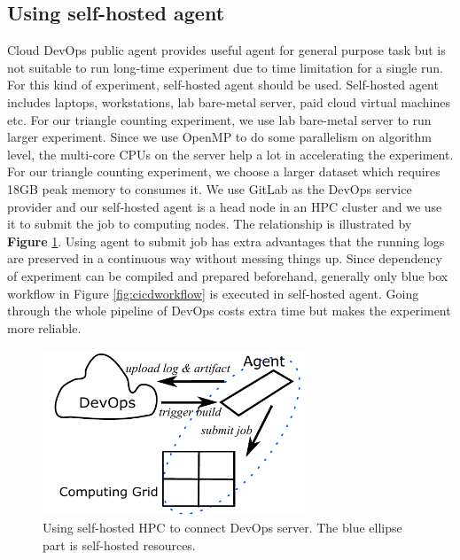 \documentclass[10pt, conference, compsocconf]{IEEEtran}
\begin{document}
\subsection{Using self-hosted agent}
Cloud DevOps public agent provides useful agent for general purpose task but is not suitable to run long-time experiment due to time limitation for a single run. For this kind of experiment, self-hosted agent should be used. Self-hosted agent includes laptops, workstations, lab bare-metal server, paid cloud virtual machines etc.
For our triangle counting experiment, we use lab bare-metal server to run larger experiment. Since we use OpenMP to do some parallelism on algorithm level, the multi-core CPUs on the server help a lot in accelerating the experiment. For our triangle counting experiment, we choose a larger dataset which requires 18GB peak memory to consumes it. We use GitLab as the DevOps service provider and our self-hosted agent is a head node in an HPC cluster and we use it to submit the job to computing nodes.
The relationship is illustrated by {\bf Figure} \ref{fig:selfhosted}. Using agent to submit job has extra advantages that the running logs are preserved in a continuous way without messing things up. Since dependency of experiment can be compiled and prepared beforehand, generally only blue box workflow in Figure \ref{fig:cicdworkflow}
is executed in self-hosted agent. Going through the whole pipeline of DevOps costs extra time but makes the experiment more reliable.

\begin{figure}[!ht]
\centerline{\includegraphics[width=18.5pc]{self-hosted.pdf}}
\caption{Using self-hosted HPC to connect DevOps server. The blue ellipse part is self-hosted resources.}\label{fig:selfhosted}
\end{figure}
\end{document}
